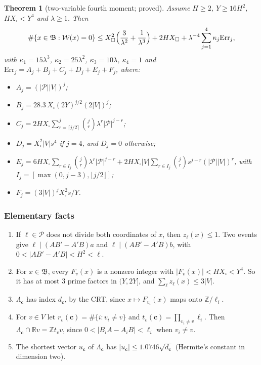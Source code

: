 \documentclass[11pt]{amsart}
\newtheorem{theorem}{Theorem}[section]
\theoremstyle{definition}
\newcommand{\Z}{\mathbb{Z}}
\newcommand{\R}{\mathbb{R}}
\newcommand{\Xb}{X_{\square}}
\begin{document}
\begin{theorem}[two-variable fourth moment; proved]\label{thm:fourth}
Assume $H\ge2$, $Y\ge16H^2$, $H\Xb<Y^4$ and $\lambda\ge1$. Then
\[
  \#\{x\in\mathfrak B:\mathcal W(x)=0\}\le \Xb^2\Bigl(\frac3{\lambda^2}+\frac1{\lambda^3}\Bigr)
  +2H\Xb+\lambda^{-4}\sum_{j=1}^4\kappa_j\mathrm{Err}_j,
\]
with $\kappa_1=15\lambda^3$, $\kappa_2=25\lambda^2$, $\kappa_3=10\lambda$, $\kappa_4=1$ and
$\mathrm{Err}_j=A_j+B_j+C_j+D_j+E_j+F_j$, where:
\begin{itemize}
\item $A_j=(|\mathcal P||V|)^j$;
\item $B_j=28.3\,\Xb(2Y)^{j/2}(2|V|)^j$;
\item $C_j=2H\Xb\sum_{r=\lceil j/2\rceil}^{j}\binom jr\lambda^r|\mathcal P|^{j-r}$;
\item $D_j=\Xb^2|V|s^4$ if $j=4$, and $D_j=0$ otherwise;
\item $E_j=6H\Xb\sum_{r\in I_j}\binom jr\lambda^r|\mathcal P|^{j-r}
  +2H\Xb|V|\sum_{r\in I_j}\binom jrs^{j-r}(|\mathcal P||V|)^r$, with
  $I_j=[\max(0,j-3),\lfloor j/2\rfloor]$;
\item $F_j=(3|V|)^j\Xb^2s/Y$.
\end{itemize}
\end{theorem}

\subsubsection{Elementary facts}
\begin{enumerate}[label=(F\arabic*)]
\item If $\ell\in\mathcal P$ does not divide both coordinates of $x$, then $z_\ell(x)\le1$.
  Two events give $\ell\mid(AB'-A'B)a$ and $\ell\mid(AB'-A'B)b$, with $0<|AB'-A'B|<H^2<\ell$.
\item For $x\in\mathfrak B$, every $F_v(x)$ is a nonzero integer with $|F_v(x)|<H\Xb<Y^4$. So it
  has at most $3$ prime factors in $(Y,2Y]$, and $\sum_\ell z_\ell(x)\le3|V|$.
\item $\Lambda_{\mathbf c}$ has index $d_{\mathbf c}$, by the CRT, since $x\mapsto F_{v_i}(x)$
  maps onto $\Z/\ell_i$.
\item For $v\in V$ let $r_v(\mathbf c)=\#\{i:v_i\ne v\}$ and $t_v(\mathbf c)=\prod_{v_i\ne
  v}\ell_i$. Then $\Lambda_{\mathbf c}\cap\R v=\Z t_vv$, since $0<|B_iA-A_iB|<\ell_i$ when
  $v_i\ne v$.
\item The shortest vector $u_{\mathbf c}$ of $\Lambda_{\mathbf c}$ has
  $|u_{\mathbf c}|\le1.0746\sqrt{d_{\mathbf c}}$ (Hermite's constant in dimension two).
\end{enumerate}
\end{document}
